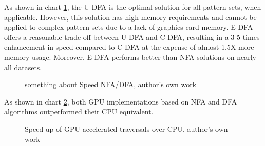 \documentclass[10pt,onecolumn,twoside,english,a4paper]{article}
\begin{document}
As shown in chart \ref{speed NFA/DFA:becchi}, the U-DFA is the optimal solution for all pattern-sets, when applicable. However, this solution has high memory requirements and cannot be applied to complex pattern-sets due to a lack of graphics card memory.
E-DFA offers a reasonable trade-off between U-DFA and C-DFA, resulting in a 3-5 times enhancement in speed compared to C-DFA at the expense of almost 1.5X more memory usage. Moreover, E-DFA performs better than NFA solutions on nearly all datasets.

\begin{figure}[h!]
  \centering
  \begin{tikzpicture}

  \end{tikzpicture}
  \caption{something about Speed NFA/DFA, author's own work}
  \label{speed NFA/DFA:becchi}
\end{figure}

As shown in chart \ref{speedup:becchi}, both GPU implementations based on NFA and DFA algorithms outperformed their CPU equivalent.

\begin{figure}[h!]
  \centering
  \caption{Speed up of GPU accelerated traversals over CPU, author's own work}
  \label{speedup:becchi}
\end{figure}
\end{document}
